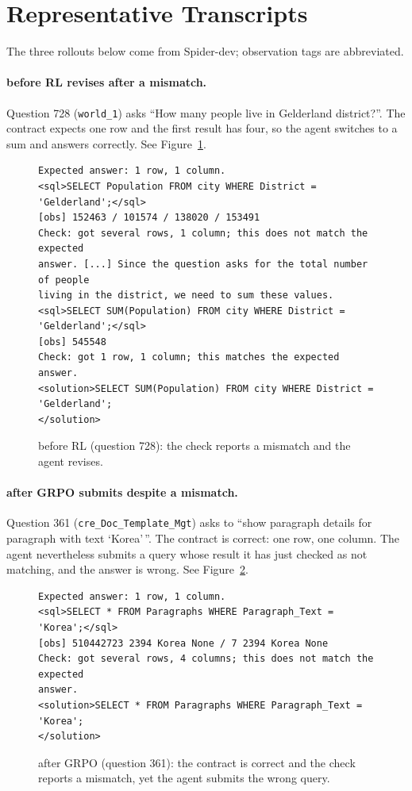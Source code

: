 

\section{Representative Transcripts}
\label{app:transcript}

The three rollouts below come from Spider-dev; observation tags are abbreviated.

\paragraph{\armG{} before RL revises after a mismatch.}
Question 728 (\texttt{world\_1}) asks ``How many people live in Gelderland district?''. The contract expects one row and the first result has four, so the agent switches to a sum and answers correctly. See Figure~\ref{fig:tr728}.

\begin{figure}[t]
\begin{Verbatim}[frame=single,fontsize=\small,framesep=2mm,rulecolor=\color{black!35}]
Expected answer: 1 row, 1 column.
<sql>SELECT Population FROM city WHERE District = 'Gelderland';</sql>
[obs] 152463 / 101574 / 138020 / 153491
Check: got several rows, 1 column; this does not match the expected
answer. [...] Since the question asks for the total number of people
living in the district, we need to sum these values.
<sql>SELECT SUM(Population) FROM city WHERE District = 'Gelderland';</sql>
[obs] 545548
Check: got 1 row, 1 column; this matches the expected answer.
<solution>SELECT SUM(Population) FROM city WHERE District = 'Gelderland';
</solution>
\end{Verbatim}
\caption{\armG{} before RL (question 728): the check reports a mismatch and the agent revises.}
\label{fig:tr728}
\end{figure}

\paragraph{\armG{} after GRPO submits despite a mismatch.}
Question 361 (\texttt{cre\_Doc\_Template\_Mgt}) asks to ``show paragraph details for paragraph with text `Korea'\,''. The contract is correct: one row, one column. The agent nevertheless submits a query whose result it has just checked as not matching, and the answer is wrong. See Figure~\ref{fig:tr361}.

\begin{figure}[t]
\begin{Verbatim}[frame=single,fontsize=\small,framesep=2mm,rulecolor=\color{black!35}]
Expected answer: 1 row, 1 column.
<sql>SELECT * FROM Paragraphs WHERE Paragraph_Text = 'Korea';</sql>
[obs] 510442723 2394 Korea None / 7 2394 Korea None
Check: got several rows, 4 columns; this does not match the expected
answer.
<solution>SELECT * FROM Paragraphs WHERE Paragraph_Text = 'Korea';
</solution>
\end{Verbatim}
\caption{\armG{} after GRPO (question 361): the contract is correct and the check reports a mismatch, yet the agent submits the wrong query.}
\label{fig:tr361}
\end{figure}

